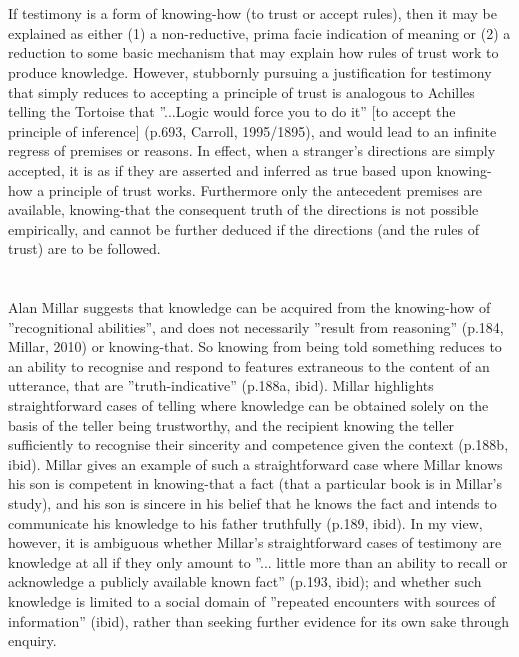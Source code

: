 \documentclass[a4paper, 11pt]{article} %
\begin{document}
\section*{}

If testimony is a form of knowing-how (to trust or accept rules), then it may be explained as either (1) a non-reductive, prima facie indication of meaning or (2) a reduction to some basic mechanism that may explain how rules of trust work to produce knowledge. However, stubbornly pursuing a justification for testimony that simply reduces to accepting a principle of trust is analogous to Achilles telling the Tortoise that ''...Logic would force you to do it'' [to accept the principle of inference] (p.693, Carroll, 1995/1895)\cite{Carroll:1995}, and would lead to an infinite regress of premises or reasons. In effect, when a stranger's directions are simply accepted, it is as if they are asserted and inferred as true based upon knowing-how a principle of trust works. Furthermore only the antecedent premises are available, knowing-that the consequent truth of the directions is not possible empirically, and cannot be further deduced if the directions (and the rules of trust) are to be followed.

\section*{}

Alan Millar suggests that knowledge can be acquired from the knowing-how of ''recognitional abilities'', and does not necessarily ''result from reasoning'' (p.184, Millar, 2010) or knowing-that. So knowing from being told something reduces to an ability to recognise and respond to features extraneous to the content of an utterance, that are ''truth-indicative'' (p.188a, ibid). Millar highlights straightforward cases of telling where knowledge can be obtained solely on the basis of the teller being trustworthy, and the recipient knowing the teller sufficiently to recognise their sincerity and competence given the context (p.188b, ibid). Millar gives an example of such a straightforward case where Millar knows his son is competent in knowing-that a fact (that a particular book is in Millar's study), and his son is sincere in his belief that he knows the fact and intends to communicate his knowledge to his father truthfully (p.189, ibid).  In my view, however, it is ambiguous whether Millar’s straightforward cases of testimony are knowledge at all if they only amount to ''... little more than an ability to recall or acknowledge a publicly available known fact'' (p.193, ibid); and whether such knowledge is limited to a social domain of ''repeated encounters with sources of information'' (ibid), rather than seeking further evidence for its own sake through enquiry.
\end{document}
